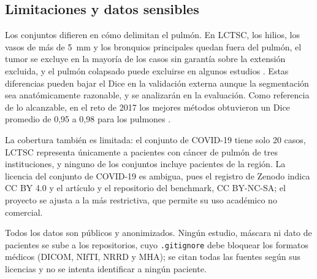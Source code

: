 \subsection{Limitaciones y datos sensibles}\label{sec:data-limitations}
Los conjuntos difieren en cómo delimitan el pulmón. En LCTSC, los hilios, los
vasos de más de 5~mm y los bronquios principales quedan fuera del pulmón, el
tumor se excluye en la mayoría de los casos sin garantía sobre la extensión
excluida, y el pulmón colapsado puede excluirse en algunos estudios
\parencite{yang2017}. Estas diferencias pueden bajar el Dice en la validación
externa aunque la segmentación sea anatómicamente razonable, y se analizarán
en la evaluación. Como referencia de lo alcanzable, en el reto de 2017 los
mejores métodos obtuvieron un Dice promedio de 0,95 a 0,98 para los pulmones
\parencite{yang2018}.

La cobertura también es limitada: el conjunto de COVID-19 tiene solo 20
casos, LCTSC representa únicamente a pacientes con cáncer de pulmón de tres
instituciones, y ninguno de los conjuntos incluye pacientes de la región. La
licencia del
conjunto de COVID-19 es ambigua, pues el registro de Zenodo indica CC BY 4.0
y el artículo y el repositorio del benchmark, CC BY-NC-SA; el proyecto se
ajusta a la más restrictiva, que permite su uso académico no comercial.

Todos los datos son públicos y anonimizados. Ningún estudio, máscara ni dato de
pacientes se sube a los repositorios, cuyo \texttt{.gitignore} debe bloquear
los formatos médicos (DICOM, NIfTI, NRRD y MHA); se citan todas las fuentes
según sus licencias y no se intenta identificar a ningún paciente.
